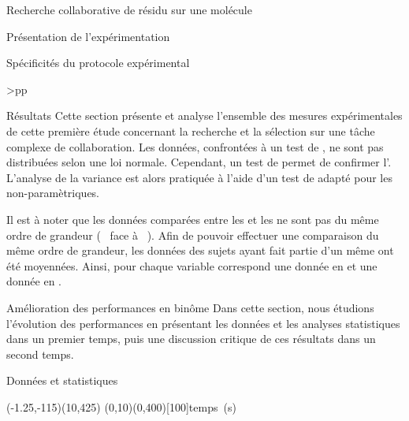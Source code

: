 \documentclass[myfrancais,ngerman,english,french]{mythesis}
\begin{document}
\begin{mychapter}{Recherche collaborative de résidu sur une molécule}
\begin{mysection}{Présentation de l'expérimentation}
\begin{mysubsection}{Spécificités du protocole expérimental}
\begin{mytable}
\begin{mytabular}{>{\bfseries}p{\exponefirstcolumn}p{\exponesecondcolumn}}
{						} \\
						\mybottomrule
					\end{mytabular}
				\end{mytable}
			\end{mysubsection}
		\end{mysection}
		\begin{mysection}{Résultats}
			Cette section présente et analyse l'ensemble des mesures expérimentales de cette première étude concernant la recherche et la sélection sur une tâche complexe de collaboration.
			Les données, confrontées à un test de , ne sont pas distribuées selon une loi normale.
			Cependant, un test de  permet de confirmer l'.
			L'analyse de la variance est alors pratiquée à l'aide d'un test de  adapté pour les  non-paramètriques.

			Il est à noter que les données comparées entre les  et les  ne sont pas du même ordre de grandeur (~ face à ~).
			Afin de pouvoir effectuer une comparaison du même ordre de grandeur, les données des sujets ayant fait partie d'un même  ont été moyennées.
			Ainsi, pour chaque variable correspond une donnée en  et une donnée en .
			\begin{mysubsection}{Amélioration des performances en binôme}
				Dans cette section, nous étudions l'évolution des performances en présentant les données et les analyses statistiques dans un premier temps, puis une discussion critique de ces résultats dans un second temps.
				\begin{mysubsubsection}{Données et statistiques}
					\begin{myfigure}
						\begin{myps}(-1.25,-115)(10,425)
							\myaxes(0,10){}(0,400)[100]{temps~(s)}
						\end{myps}
					\end{myfigure}


\end{mysubsubsection}
\end{mysubsection}
\end{mysection}
\end{mychapter}
\end{document}
